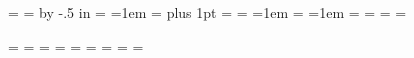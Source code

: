 \BetweenDefSkip=\bigskipamount   %
\NameBoxWd=\hsize		 %
\advance\NameBoxWd by -.5 in
\NameBoxSkip=\medskipamount	%
\BeforeUsage=1em 		%
\AfterUsage=\smallskipamount	%
\BeforeArgument=0pt 		%
\BetweenArgument=0pt plus 1pt	%
\AfterArgument=\medskipamount	%
\BreakSingleReturnfalse
\BeforeReturn=0pt 		%
\BetweenReturn=0pt 		%
\AfterReturn=\medskipamount	%
\BeforeParent=1em		%
\AfterParent=\smallskipamount	%
\BeforeChildren=1em		%
\AfterChildren=\smallskipamount	%
\BeforeDocumentation=\parskip	%
\AfterDocumentation=\bigskipamount	%
\Sourceskip=\smallskipamount		%
\parskip=0pt 

\BeforeDesc = \smallskipamount
\AfterDesc = \smallskipamount
\BeforeValue = \smallskipamount
\AfterValue = \smallskipamount
\BetweenRefs = \smallskipamount
\AfterRefs = \smallskipamount
\BetweenExs = \smallskipamount
\AfterExs = \smallskipamount
\afterTitle = \medskipamount

